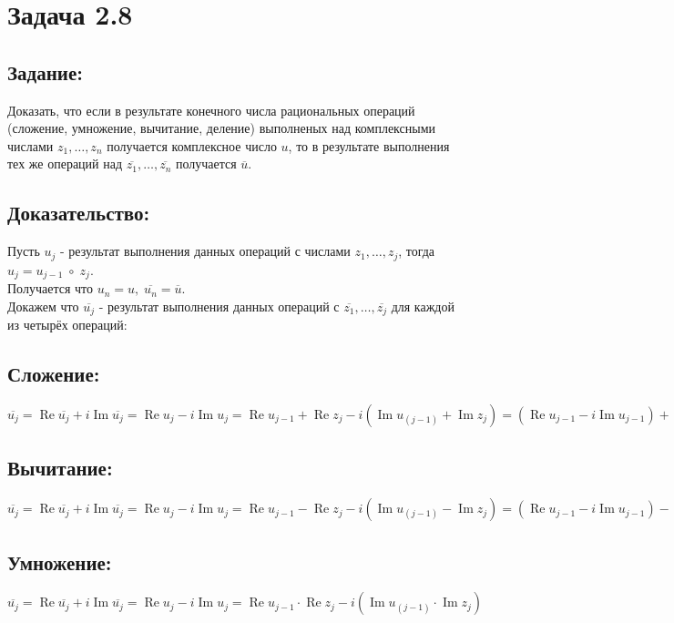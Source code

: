 \section{Задача 2.8}
\subsection{Задание:}
Доказать, что если в результате конечного числа рациональных операций (сложение, умножение, вычитание, деление)
выполненых над комплексными числами $ z_1, \dots, z_n $ получается комплексное число $ u $, то в результате выполнения тех же
операций над $ \overline{z_1}, \dots, \overline{z_n} $ получается $ \overline{u} $.
\subsection{Доказательство:}
Пусть $ u_j $ - результат выполнения данных операций с числами $ z_1, \dots, z_j $,
тогда $ u_j = u_{j-1} \; \circ \; z_j $.
\\
Получается что $ u_n = u, \; \overline{u_n} = \overline{u} $.
\\
Докажем что $ \overline{u_j} $ - результат выполнения данных операций с $ \overline{z_1}, \dots, \overline{z_j} $
для каждой из четырёх операций:
\subsection{Сложение:}
$
	\overline{u_j}
	=
	\operatorname{Re} \overline{u_j} + i \operatorname{Im} \overline{u_j}
	=
	\operatorname{Re} u_j - i \operatorname{Im} u_j
	=
	\operatorname{Re} u_{j-1} + \operatorname{Re} z_j - i(\operatorname{Im} u_(j-1) + \operatorname{Im} z_j)
	=
	(\operatorname{Re} u_{j-1} - i\operatorname{Im} u_{j-1}) + (\operatorname{Re} z_j - i\operatorname{Im} z_j)
	=
	\overline{u_{j-1}} + \overline{z_j}
$
\subsection{Вычитание:}
$
	\overline{u_j}
	=
	\operatorname{Re} \overline{u_j} + i \operatorname{Im} \overline{u_j}
	=
	\operatorname{Re} u_j - i \operatorname{Im} u_j
	=
	\operatorname{Re} u_{j-1} - \operatorname{Re} z_j - i(\operatorname{Im} u_(j-1) - \operatorname{Im} z_j)
	=
	(\operatorname{Re} u_{j-1} - i\operatorname{Im} u_{j-1}) - (\operatorname{Re} z_j - i\operatorname{Im} z_j)
	=
	\overline{u_{j-1}} - \overline{z_j}
$
\subsection{Умножение:}
$
	\overline{u_j}
	=
	\operatorname{Re} \overline{u_j} + i \operatorname{Im} \overline{u_j}
	=
	\operatorname{Re} u_j - i \operatorname{Im} u_j
	=
	\operatorname{Re} u_{j-1} \cdot \operatorname{Re} z_j - i(\operatorname{Im} u_(j-1) \cdot \operatorname{Im} z_j)
$
